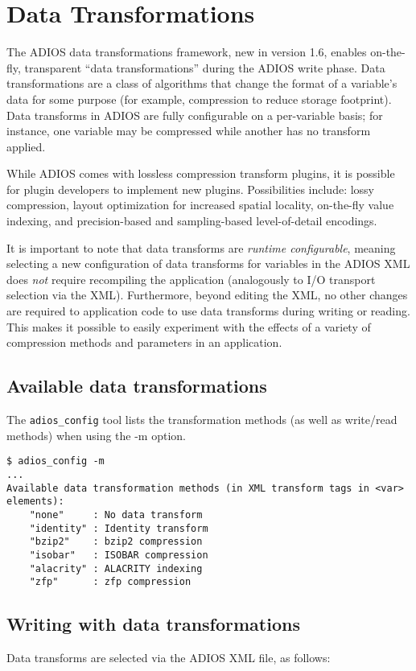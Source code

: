 \chapter{Data Transformations}
\label{sec:transform_plugins}
The ADIOS data transformations framework, new in version 1.6, enables on-the-fly, transparent ``data transformations'' during the ADIOS
write phase. Data transformations are a class of algorithms that change the format of a variable's data for some purpose
(for example, compression to reduce storage footprint).
Data transforms in ADIOS are fully configurable on a per-variable basis; for instance, one variable
may be compressed while another has no transform applied.

While ADIOS comes with lossless compression transform plugins, it is possible for plugin developers to implement new plugins.
Possibilities include: lossy compression, layout optimization for increased spatial locality,
on-the-fly value indexing, and precision-based and sampling-based level-of-detail encodings.

It is important to note that data transforms are \emph{runtime configurable}, meaning selecting a new configuration of data
transforms for variables in the ADIOS XML does \emph{not} require recompiling the application (analogously to I/O transport
selection via the XML). Furthermore, beyond editing the XML, no other changes are required to application code to use data
transforms during writing or reading. This makes it possible to easily experiment with the effects of a variety of compression
methods and parameters in an application.

\section{Available data transformations}
The \verb+adios_config+ tool lists the transformation methods (as well as write/read methods) when using the -m option.

\begin{lstlisting}
$ adios_config -m
...
Available data transformation methods (in XML transform tags in <var> elements):
    "none"     : No data transform
    "identity" : Identity transform
    "bzip2"    : bzip2 compression
    "isobar"   : ISOBAR compression
    "alacrity" : ALACRITY indexing
    "zfp"      : zfp compression
\end{lstlisting}


\section{Writing with data transformations}
Data transforms are selected via the ADIOS XML file, as follows:


